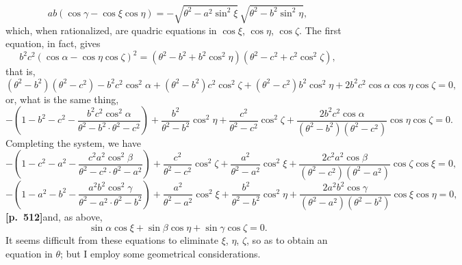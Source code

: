 \documentclass[11pt,a4paper]{article}
\begin{document}
\[
ab(\cos\gamma - \cos\xi\cos\eta) = -\sqrt{\theta^{2} - a^{2}\sin^{2}\xi}\,\sqrt{\theta^{2} - b^{2}\sin^{2}\eta},
\]
which, when rationalized, are quadric equations in $\cos\xi$, $\cos\eta$, $\cos\zeta$. The first equation, in fact, gives
\[
b^{2}c^{2}(\cos\alpha - \cos\eta\cos\zeta)^{2} = (\theta^{2} - b^{2} + b^{2}\cos^{2}\eta)(\theta^{2} - c^{2} + c^{2}\cos^{2}\zeta),
\]
that is,
\[
(\theta^{2} - b^{2})(\theta^{2} - c^{2}) - b^{2}c^{2}\cos^{2}\alpha + (\theta^{2} - b^{2})c^{2}\cos^{2}\zeta + (\theta^{2} - c^{2})b^{2}\cos^{2}\eta + 2b^{2}c^{2}\cos\alpha\cos\eta\cos\zeta = 0,
\]
or, what is the same thing,
\[
-\left(1 - b^{2} - c^{2} - \frac{b^{2}c^{2}\cos^{2}\alpha}{\theta^{2} - b^{2} \cdot \theta^{2} - c^{2}}\right) + \frac{b^{2}}{\theta^{2} - b^{2}}\cos^{2}\eta + \frac{c^{2}}{\theta^{2} - c^{2}}\cos^{2}\zeta + \frac{2b^{2}c^{2}\cos\alpha}{(\theta^{2} - b^{2})(\theta^{2} - c^{2})}\cos\eta\cos\zeta = 0.
\]
Completing the system, we have
\[
-\left(1 - c^{2} - a^{2} - \frac{c^{2}a^{2}\cos^{2}\beta}{\theta^{2} - c^{2} \cdot \theta^{2} - a^{2}}\right) + \frac{c^{2}}{\theta^{2} - c^{2}}\cos^{2}\zeta + \frac{a^{2}}{\theta^{2} - a^{2}}\cos^{2}\xi + \frac{2c^{2}a^{2}\cos\beta}{(\theta^{2} - c^{2})(\theta^{2} - a^{2})}\cos\zeta\cos\xi = 0,
\]
\[
-\left(1 - a^{2} - b^{2} - \frac{a^{2}b^{2}\cos^{2}\gamma}{\theta^{2} - a^{2} \cdot \theta^{2} - b^{2}}\right) + \frac{a^{2}}{\theta^{2} - a^{2}}\cos^{2}\xi + \frac{b^{2}}{\theta^{2} - b^{2}}\cos^{2}\eta + \frac{2a^{2}b^{2}\cos\gamma}{(\theta^{2} - a^{2})(\theta^{2} - b^{2})}\cos\xi\cos\eta = 0,
\]
\noindent\textbf{[p.~512]}\quad and, as above,
\[
\sin\alpha\cos\xi + \sin\beta\cos\eta + \sin\gamma\cos\zeta = 0.
\]
It seems difficult from these equations to eliminate $\xi$, $\eta$, $\zeta$, so as to obtain an equation in $\theta$; but I employ some geometrical considerations.
\end{document}
